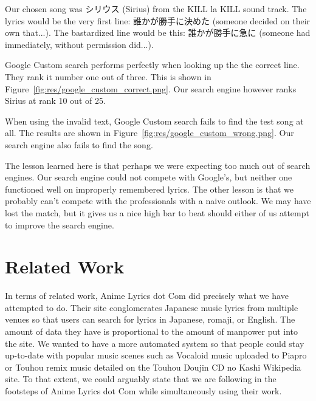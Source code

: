 \documentclass{acm} %
\begin{document}
\begin{CJK}{UTF8}{zhsong}
Our chosen song was シリウス (Sirius) from the KILL la KILL sound track. The lyrics would be the very first line: 誰かが勝手に決めた (someone decided on their own that...). The bastardized line would be this: 誰かが勝手に急に (someone had immediately, without permission did...).

Google Custom search performs perfectly when looking up the the correct line. They rank it number one out of three. This is shown in Figure~\ref{fig:res/google_custom_correct.png}. Our search engine however ranks Sirius at rank 10 out of 25.


When using the invalid text, Google Custom search fails to find the test song at all. The results are shown in Figure~\ref{fig:res/google_custom_wrong.png}. Our search engine also fails to find the song.


The lesson learned here is that perhaps we were expecting too much out of search engines. Our search engine could not compete with Google's, but neither one functioned well on improperly remembered lyrics. The other lesson is that we probably can't compete with the professionals with a naive outlook. We may have lost the match, but it gives us a nice high bar to beat should either of us attempt to improve the search engine.



\section{Related Work}

In terms of related work, Anime Lyrics dot Com did precisely what we have attempted to do. Their site conglomerates Japanese music lyrics from multiple venues so that users can search for lyrics in Japanese, romaji, or English. The amount of data they have is proportional to the amount of manpower put into the site. We wanted to have a more automated system so that people could stay up-to-date with popular music scenes such as Vocaloid music uploaded to Piapro or Touhou remix music detailed on the Touhou Doujin CD no Kashi Wikipedia site. To that extent, we could arguably state that we are following in the footsteps of Anime Lyrics dot Com while simultaneously using their work.


\end{CJK}
\end{document}
